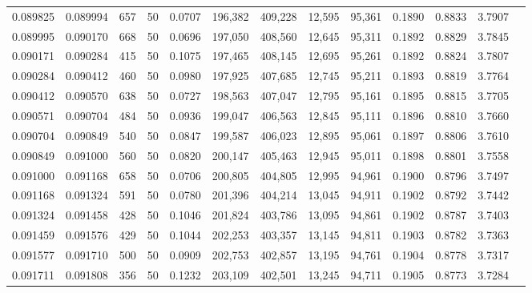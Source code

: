 \begin{tabular}{rrrrrrrrrrrrr}
0.089825 & 0.089994 &   657 &  50 &                                     0.0707 & 196,382 & 409,228 &  12,595 &  95,361 & 0.1890 & 0.8833 & 3.7907 \\
0.089995 & 0.090170 &   668 &  50 &                                     0.0696 & 197,050 & 408,560 &  12,645 &  95,311 & 0.1892 & 0.8829 & 3.7845 \\
0.090171 & 0.090284 &   415 &  50 &                                     0.1075 & 197,465 & 408,145 &  12,695 &  95,261 & 0.1892 & 0.8824 & 3.7807 \\
0.090284 & 0.090412 &   460 &  50 &                                     0.0980 & 197,925 & 407,685 &  12,745 &  95,211 & 0.1893 & 0.8819 & 3.7764 \\
0.090412 & 0.090570 &   638 &  50 &                                     0.0727 & 198,563 & 407,047 &  12,795 &  95,161 & 0.1895 & 0.8815 & 3.7705 \\
0.090571 & 0.090704 &   484 &  50 &                                     0.0936 & 199,047 & 406,563 &  12,845 &  95,111 & 0.1896 & 0.8810 & 3.7660 \\
0.090704 & 0.090849 &   540 &  50 &                                     0.0847 & 199,587 & 406,023 &  12,895 &  95,061 & 0.1897 & 0.8806 & 3.7610 \\
0.090849 & 0.091000 &   560 &  50 &                                     0.0820 & 200,147 & 405,463 &  12,945 &  95,011 & 0.1898 & 0.8801 & 3.7558 \\
0.091000 & 0.091168 &   658 &  50 &                                     0.0706 & 200,805 & 404,805 &  12,995 &  94,961 & 0.1900 & 0.8796 & 3.7497 \\
0.091168 & 0.091324 &   591 &  50 &                                     0.0780 & 201,396 & 404,214 &  13,045 &  94,911 & 0.1902 & 0.8792 & 3.7442 \\
0.091324 & 0.091458 &   428 &  50 &                                     0.1046 & 201,824 & 403,786 &  13,095 &  94,861 & 0.1902 & 0.8787 & 3.7403 \\
0.091459 & 0.091576 &   429 &  50 &                                     0.1044 & 202,253 & 403,357 &  13,145 &  94,811 & 0.1903 & 0.8782 & 3.7363 \\
0.091577 & 0.091710 &   500 &  50 &                                     0.0909 & 202,753 & 402,857 &  13,195 &  94,761 & 0.1904 & 0.8778 & 3.7317 \\
0.091711 & 0.091808 &   356 &  50 &                                     0.1232 & 203,109 & 402,501 &  13,245 &  94,711 & 0.1905 & 0.8773 & 3.7284 \\

\end{tabular}
